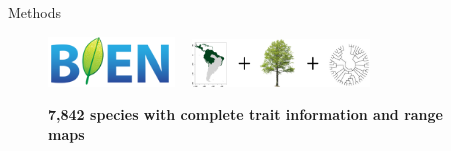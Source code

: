 \documentclass[final]{beamer}
\newlength{\onecolwid}
\begin{document}
\begin{frame}[t]
\begin{columns}[t]
\begin{column}{\onecolwid}
\begin{block}{Methods}
%
%
%
%
%
%
%
%
%
%

\begin{figure}[h]
	\centering
	\includegraphics[width=0.3\textwidth]{./logos/bien_logo_notext-1.png}
	~
	\includegraphics[width=0.42\textwidth]{./figures/Methods_figs.png}
	\caption{\footnotesize \textbf{7,842 species with complete trait information and range maps}}
	\label{fig:methods}
\end{figure}



\end{block}
\end{column}
\end{columns}
\end{frame}
\end{document}

